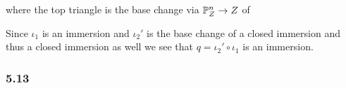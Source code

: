 \documentclass[12pt]{article}
\begin{document}
\begin{enumerate}
\begin{center}
\end{center}
where the top triangle is the base change via $\P^n_Z \to Z$ of
\begin{center}
\end{center}
Since $\iota_1$ is an immersion and $\iota_2'$ is the base change of a closed immersion and thus a closed immersion as well we see that $q = \iota_2' \circ \iota_1$ is an immersion.

\end{enumerate}


\subsubsection{5.13}
\end{document}
